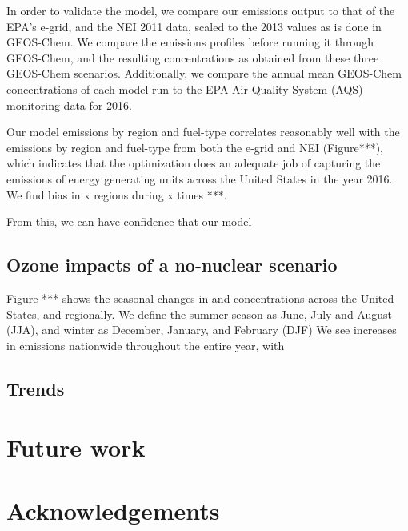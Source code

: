 \documentclass[12]{article}
\begin{document}
In order to validate the model, we compare our emissions output to that of the EPA's e-grid, and the NEI 2011 data, scaled to the 2013 values as is done in GEOS-Chem. We compare the emissions profiles before running it through GEOS-Chem, and the resulting concentrations as obtained from these three GEOS-Chem scenarios. Additionally, we compare the annual mean GEOS-Chem concentrations of each model run to the EPA Air Quality System (AQS) monitoring data for 2016. 

Our model emissions by region and fuel-type correlates reasonably well with the emissions by region and fuel-type from both the e-grid and NEI (Figure***), which indicates that the optimization does an adequate job of capturing the emissions of energy generating units across the United States in the year 2016. We find bias in x regions during x times ***.

From this, we can have confidence that our model 
\subsection{Ozone impacts of a no-nuclear scenario}

Figure *** shows the seasonal changes in  and  concentrations across the United States, and regionally. We define the summer season as June, July and August (JJA), and winter as December, January, and February (DJF) We see increases in  emissions nationwide throughout the entire year, with 


\subsection{ Trends}

\section{Future work}



\section{Acknowledgements}


\pagebreak


\end{document}

